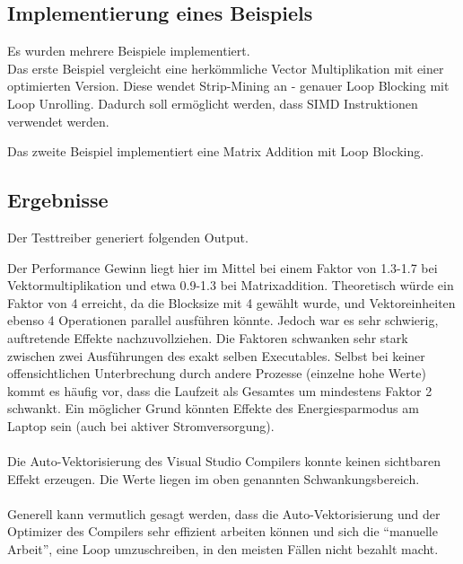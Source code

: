 
\subsection{Implementierung eines Beispiels}

Es wurden mehrere Beispiele implementiert. \\
Das erste Beispiel vergleicht eine herkömmliche Vector Multiplikation mit einer optimierten Version. Diese wendet Strip-Mining an - genauer Loop Blocking mit Loop Unrolling. Dadurch soll ermöglicht werden, dass SIMD Instruktionen verwendet werden.\\

	
Das zweite Beispiel implementiert eine Matrix Addition mit Loop Blocking.\\



\subsection{Ergebnisse}

Der Testtreiber generiert folgenden Output.\\


Der Performance Gewinn liegt hier im Mittel bei einem Faktor von 1.3-1.7 bei Vektormultiplikation und etwa 0.9-1.3 bei Matrixaddition. Theoretisch würde ein Faktor von 4 erreicht, da die Blocksize mit 4 gewählt wurde, und Vektoreinheiten ebenso 4 Operationen parallel ausführen könnte. Jedoch war es sehr schwierig, auftretende Effekte nachzuvollziehen. Die Faktoren schwanken sehr stark zwischen zwei Ausführungen des exakt selben Executables. Selbst bei keiner offensichtlichen Unterbrechung durch andere Prozesse (einzelne hohe Werte) kommt es häufig vor, dass die Laufzeit als Gesamtes um mindestens Faktor 2 schwankt. Ein möglicher Grund könnten Effekte des Energiesparmodus am Laptop sein (auch bei aktiver Stromversorgung).\\
\\
Die Auto-Vektorisierung des Visual Studio Compilers konnte keinen sichtbaren Effekt erzeugen. Die Werte liegen im oben genannten Schwankungsbereich.\\
\\
Generell kann vermutlich gesagt werden, dass die Auto-Vektorisierung und der Optimizer des Compilers sehr effizient arbeiten können und sich die ``manuelle Arbeit'', eine Loop umzuschreiben, in den meisten Fällen nicht bezahlt macht. \\
\\


